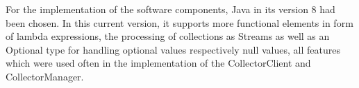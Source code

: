 For the implementation of the software components, Java in its version 8 had been chosen. In this current version,
it supports more functional elements in form of lambda expressions, the processing of collections as Streams as well
as an Optional type for handling optional values respectively null values, all features which were used often in the
implementation of the CollectorClient and CollectorManager.
%
%
%
%
%
%
%
